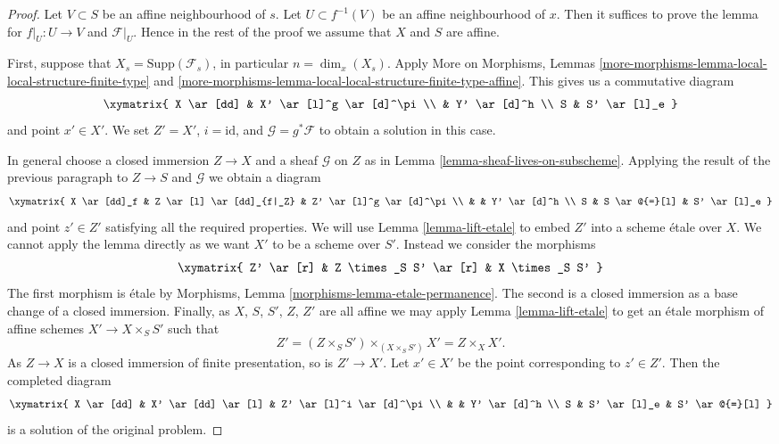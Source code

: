 \begin{proof}
Let $V \subset S$ be an affine neighbourhood of $s$.
Let $U \subset f^{-1}(V)$ be an affine neighbourhood of $x$.
Then it suffices to prove the lemma for $f|_U : U \to V$ and
$\mathcal{F}|_U$. Hence in the rest of the proof we assume that
$X$ and $S$ are affine.

\medskip\noindent
First, suppose that $X_s = \text{Supp}(\mathcal{F}_s)$, in particular
$n = \dim_x(X_s)$. Apply
More on Morphisms,
Lemmas \ref{more-morphisms-lemma-local-local-structure-finite-type} and
\ref{more-morphisms-lemma-local-local-structure-finite-type-affine}.
This gives us a commutative diagram
$$
\xymatrix{
X \ar[dd] & X' \ar[l]^g \ar[d]^\pi \\
& Y' \ar[d]^h  \\
S & S' \ar[l]_e
}
$$
and point $x' \in X'$. We set $Z' = X'$, $i = \text{id}$, and
$\mathcal{G} = g^*\mathcal{F}$ to obtain a solution in this case.

\medskip\noindent
In general choose a closed immersion $Z \to X$ and a sheaf
$\mathcal{G}$ on $Z$ as in
Lemma \ref{lemma-sheaf-lives-on-subscheme}.
Applying the result of the previous paragraph to $Z \to S$ and
$\mathcal{G}$ we obtain a diagram
$$
\xymatrix{
X \ar[dd]_f & Z \ar[l] \ar[dd]_{f|_Z} & Z' \ar[l]^g \ar[d]^\pi \\
& & Y' \ar[d]^h \\
S & S \ar@{=}[l] & S' \ar[l]_e
}
$$
and point $z' \in Z'$ satisfying all the required properties.
We will use
Lemma \ref{lemma-lift-etale}
to embed $Z'$ into a scheme \'etale over $X$. We cannot apply the lemma directly
as we want $X'$ to be a scheme over $S'$. Instead we
consider the morphisms
$$
\xymatrix{
Z' \ar[r] & Z \times_S S' \ar[r] & X \times_S S'
}
$$
The first morphism is \'etale by
Morphisms, Lemma \ref{morphisms-lemma-etale-permanence}.
The second is a closed immersion as a base change of a closed immersion.
Finally, as $X$, $S$, $S'$, $Z$, $Z'$ are all affine we may apply
Lemma \ref{lemma-lift-etale}
to get an \'etale morphism of affine schemes $X' \to X \times_S S'$ such that
$$
Z' = (Z \times_S S') \times_{(X \times_S S')} X' = Z \times_X X'.
$$
As $Z \to X$ is a closed immersion of finite presentation, so is $Z' \to X'$.
Let $x' \in X'$ be the point corresponding to $z' \in Z'$.
Then the completed diagram
$$
\xymatrix{
X \ar[dd] & X' \ar[dd] \ar[l] & Z' \ar[l]^i \ar[d]^\pi \\
& & Y' \ar[d]^h \\
S & S' \ar[l]_e & S' \ar@{=}[l]
}
$$
is a solution of the original problem.
\end{proof}

